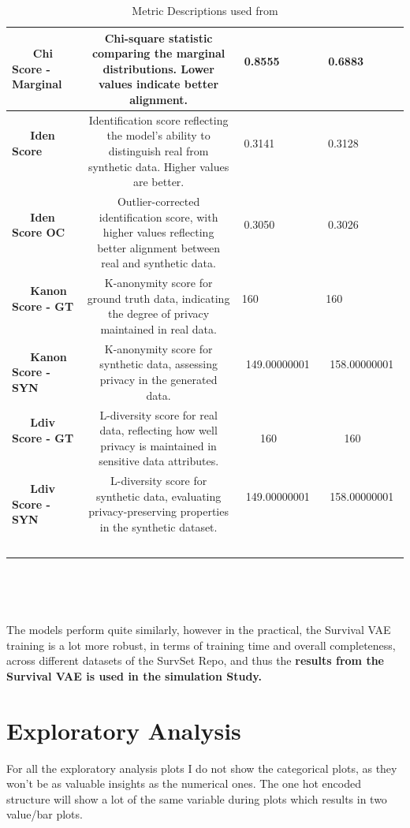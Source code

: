 \begin{landscape}
\begin{table}[H]
\begin{tabular}{|l|>{\tiny}c|c|c|}
    \textbf{Chi Score - Marginal}  & Chi-square statistic comparing the marginal distributions. Lower values indicate better alignment. & 0.8555           & 0.6883           \\ \hline
    \textbf{Iden Score}            & Identification score reflecting the model's ability to distinguish real from synthetic data. Higher values are better. & 0.3141           & 0.3128           \\ \hline
    \textbf{Iden Score OC}         & Outlier-corrected identification score, with higher values reflecting better alignment between real and synthetic data. & 0.3050           & 0.3026           \\ \hline
    \textbf{Kanon Score - GT}      & K-anonymity score for ground truth data, indicating the degree of privacy maintained in real data. & 160              & 160              \\ \hline
    \textbf{Kanon Score - SYN}     & K-anonymity score for synthetic data, assessing privacy in the generated data. & 149.00000001     & 158.00000001     \\ \hline
    \textbf{Ldiv Score - GT}       & L-diversity score for real data, reflecting how well privacy is maintained in sensitive data attributes. & 160     & 160     \\ \hline
    \textbf{Ldiv Score - SYN}      & L-diversity score for synthetic data, evaluating privacy-preserving properties in the synthetic dataset. & 149.00000001              & 158.00000001              \\ \hline
    \end{tabular}
    \caption{Metric Descriptions used from \parencite{qian_synthcity_2023}}
    \label{tab:metrics_description}
\end{table}
\end{landscape}
\clearpage
\noindent The models perform quite similarly, however in the practical, the Survival VAE training is a lot more robust, in terms of training time and overall completeness, across different datasets of the SurvSet Repo, and thus the \textbf{results from the Survival VAE is used in the simulation Study.}
\section{Exploratory Analysis}
For all the exploratory analysis plots I do not show the categorical plots, as they won't be as valuable insights as the numerical ones. The one hot encoded structure will show a lot of the same variable during plots which results in two value/bar plots.

